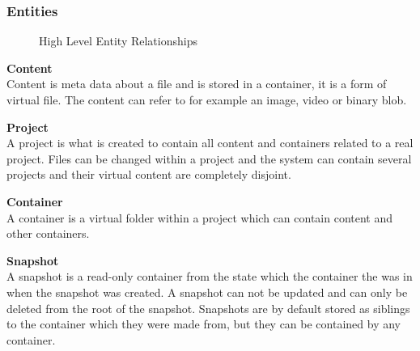 \documentclass[a4paper,12pt]{article}
\begin{document}
\subsubsection{Entities}
\begin{figure}[H] 
    \caption{High Level Entity Relationships}
    \label{fig:relation}
\end{figure}

\par \textbf{Content} \\
Content is meta data about a file and is stored in a container, it is a form of virtual file.  The
content can refer to for example an image, video or binary blob.\\

\par \textbf{Project} \\
A project is what is created to contain all content and containers related to a real project. Files
can be changed within a project and the system can contain several projects and their virtual
content are completely disjoint.\\

\par \textbf{Container} \\
A container is a virtual folder within a project which can contain content and other containers.\\

\par \textbf{Snapshot} \\
A snapshot is a read-only container from the state which the container the was in when the snapshot
was created.  A snapshot can not be updated and can only be deleted from the root of the snapshot.
Snapshots are by default stored as siblings to the container which they were made from, but they can
be contained by any container.\\
\end{document}
